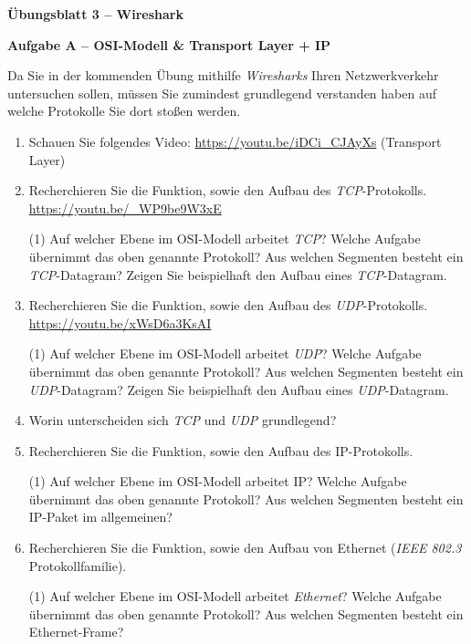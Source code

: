 \documentclass[paper=a4,fontsize=11pt]{scrartcl}%
\numberwithin{equation}{section}
\begin{document}
\begin{center}
\Large{\textbf{Übungsblatt 3 -- Wireshark}}
\end{center}

\begin{center}\Large{\textbf{Aufgabe A -- OSI-Modell \& Transport Layer + IP}}\end{center}\vskip0.25in
Da Sie in der kommenden Übung mithilfe \emph{Wiresharks} Ihren Netzwerkverkehr untersuchen sollen, müssen Sie zumindest grundlegend verstanden haben auf welche Protokolle Sie dort stoßen werden.
\begin{enumerate}
	\item Schauen Sie folgendes Video: \url{https://youtu.be/iDCi_CJAyXs} (Transport Layer)
	\item Recherchieren Sie die Funktion, sowie den Aufbau des \emph{TCP}-Protokolls.\\
	\url{https://youtu.be/_WP9be9W3xE}
	\begin{tasks}(1)
		\task Auf welcher Ebene im OSI-Modell arbeitet \emph{TCP}?
		\task Welche Aufgabe übernimmt das oben genannte Protokoll?
		\task Aus welchen Segmenten besteht ein \emph{TCP}-Datagram?
		\task Zeigen Sie beispielhaft den Aufbau eines \emph{TCP}-Datagram.
	\end{tasks}
	\item Recherchieren Sie die Funktion, sowie den Aufbau des \emph{UDP}-Protokolls.\\
	\url{https://youtu.be/xWsD6a3KsAI}
	\begin{tasks}(1)
		\task Auf welcher Ebene im OSI-Modell arbeitet \emph{UDP}?
		\task Welche Aufgabe übernimmt das oben genannte Protokoll?
		\task Aus welchen Segmenten besteht ein \emph{UDP}-Datagram?
		\task Zeigen Sie beispielhaft den Aufbau eines \emph{UDP}-Datagram.
	\end{tasks}
	\item Worin unterscheiden sich \emph{TCP} und \emph{UDP} grundlegend?
	\item Recherchieren Sie die Funktion, sowie den Aufbau des IP-Protokolls.
	\begin{tasks}(1)
		\task Auf welcher Ebene im OSI-Modell arbeitet IP?
		\task Welche Aufgabe übernimmt das oben genannte Protokoll?
		\task Aus welchen Segmenten besteht ein IP-Paket im allgemeinen?
	\end{tasks}
	\item Recherchieren Sie die Funktion, sowie den Aufbau von Ethernet (\emph{IEEE 802.3} Protokollfamilie).
	\begin{tasks}(1)
		\task Auf welcher Ebene im OSI-Modell arbeitet \emph{Ethernet}?
		\task Welche Aufgabe übernimmt das oben genannte Protokoll?
		\task Aus welchen Segmenten besteht ein Ethernet-Frame?
	\end{tasks}	
\end{enumerate}
\end{document}

